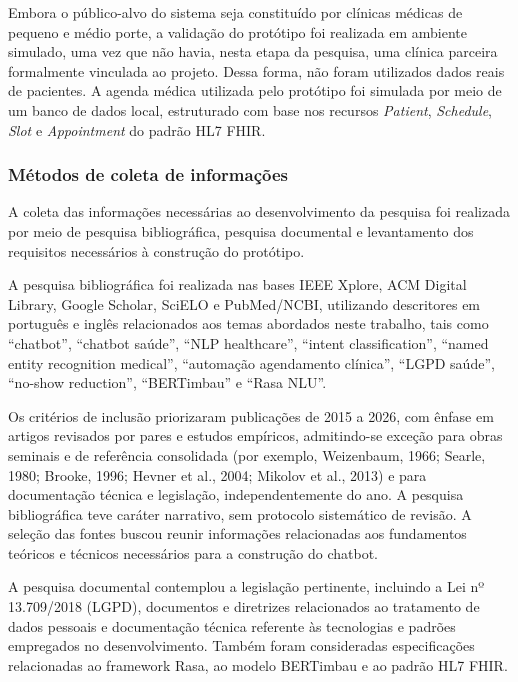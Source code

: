 \documentclass[12pt,a4paper]{extarticle}
\begin{document}
Embora o público-alvo do sistema seja constituído por clínicas médicas de pequeno e médio porte, a validação do protótipo foi realizada em ambiente simulado, uma vez que não havia, nesta etapa da pesquisa, uma clínica parceira formalmente vinculada ao projeto. Dessa forma, não foram utilizados dados reais de pacientes. A agenda médica utilizada pelo protótipo foi simulada por meio de um banco de dados local, estruturado com base nos recursos \textit{Patient}, \textit{Schedule}, \textit{Slot} e \textit{Appointment} do padrão HL7 FHIR.

\subsubsection{Métodos de coleta de informações}
\label{sec:coleta}

A coleta das informações necessárias ao desenvolvimento da pesquisa foi realizada por meio de pesquisa bibliográfica, pesquisa documental e levantamento dos requisitos necessários à construção do protótipo.

A pesquisa bibliográfica foi realizada nas bases IEEE Xplore, ACM Digital Library, Google Scholar, SciELO e PubMed/NCBI, utilizando descritores em português e inglês relacionados aos temas abordados neste trabalho, tais como ``chatbot'', ``chatbot saúde'', ``NLP healthcare'', ``intent classification'', ``named entity recognition medical'', ``automação agendamento clínica'', ``LGPD saúde'', ``no-show reduction'', ``BERTimbau'' e ``Rasa NLU''.

Os critérios de inclusão priorizaram publicações de 2015 a 2026, com ênfase em artigos revisados por pares e estudos empíricos, admitindo-se exceção para obras seminais e de referência consolidada (por exemplo, Weizenbaum, 1966; Searle, 1980; Brooke, 1996; Hevner et al., 2004; Mikolov et al., 2013) e para documentação técnica e legislação, independentemente do ano. A pesquisa bibliográfica teve caráter narrativo, sem protocolo sistemático de revisão. A seleção das fontes buscou reunir informações relacionadas aos fundamentos teóricos e técnicos necessários para a construção do chatbot.

A pesquisa documental contemplou a legislação pertinente, incluindo a Lei nº 13.709/2018 (LGPD), documentos e diretrizes relacionados ao tratamento de dados pessoais e documentação técnica referente às tecnologias e padrões empregados no desenvolvimento. Também foram consideradas especificações relacionadas ao framework Rasa, ao modelo BERTimbau e ao padrão HL7 FHIR.
\end{document}
